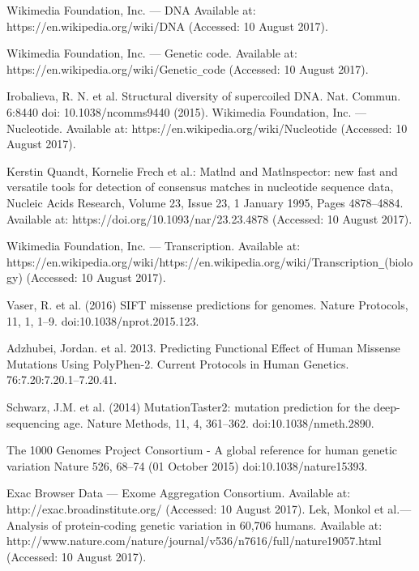 \documentclass[a4paper,12pt,twoside]{article}
\begin{document}
\newpage

\begin{thebibliography}{99}

Wikimedia Foundation, Inc. — DNA
Available at: https://en.wikipedia.org/wiki/DNA (Accessed: 10 August 2017).

Wikimedia Foundation, Inc. — Genetic code.
Available at: https://en.wikipedia.org/wiki/Genetic\verb!_!code (Accessed: 10 August 2017).

Irobalieva, R. N. et al. Structural diversity of supercoiled DNA. Nat. Commun. 6:8440 doi: 10.1038/ncomms9440 (2015).
Wikimedia Foundation, Inc. — Nucleotide.
Available at: https://en.wikipedia.org/wiki/Nucleotide (Accessed: 10 August 2017).

Kerstin Quandt, Kornelie Frech et al.: Matlnd and Matlnspector: new fast and versatile tools for detection of consensus matches in nucleotide sequence data, Nucleic Acids Research, Volume 23, Issue 23, 1 January 1995, Pages 4878–4884. Available at: https://doi.org/10.1093/nar/23.23.4878 (Accessed: 10 August 2017).

Wikimedia Foundation, Inc. — Transcription.
Available at: https://en.wikipedia.org/wiki/https://en.wikipedia.org/wiki/Transcription\verb!_!(biology) (Accessed: 10 August 2017).

Vaser, R. et al. (2016) SIFT missense predictions for genomes. 
Nature Protocols, 11,
1, 1–9. doi:10.1038/nprot.2015.123.

Adzhubei, Jordan. et al. 2013. Predicting Functional Effect of Human Missense Mutations Using PolyPhen-2. Current Protocols in Human Genetics. 76:7.20:7.20.1–7.20.41.

Schwarz, J.M. et al. (2014) MutationTaster2: mutation prediction for the deep-
sequencing age. Nature Methods, 11, 4, 361–362. doi:10.1038/nmeth.2890.

The 1000 Genomes Project Consortium - A global reference for human genetic variation
Nature 526, 68–74 (01 October 2015) doi:10.1038/nature15393.

Exac Browser Data — Exome Aggregation Consortium.
Available at: http://exac.broadinstitute.org/ (Accessed: 10 August 2017).
\newpage
{}
Lek, Monkol et al.— Analysis of protein-coding genetic variation in 60,706 humans.
Available at: http://www.nature.com/nature/journal/v536/n7616/full/nature19057.html (Accessed: 10 August 2017).


\end{thebibliography}
\end{document}
